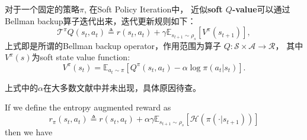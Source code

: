 对于一个固定的策略$\pi$, 在Soft Policy Iteration中，
近似{\bf soft $Q$-value}可以通过Bellman backup算子迭代出来，迭代更新规则如下：
\begin{equation}\label{soft_policy_evaluation}
\mathcal{T}^\pi Q(s_t, a_t) \triangleq r(s_t, a_t) 
+ \gamma \mathbb{E}_{s_{t+1}\sim\rho_s} [V^\pi(s_{t+1})],
\end{equation}
上式即是所谓的Bellman backup operator，作用范围为算子
$Q: \mathcal{S} \times \mathcal{A} \rightarrow \mathcal{R}$，
其中$V^\pi(s)$为soft state value function:
$$
V^\pi(s_t) = \mathbb{E}_{a_t\sim\pi}[Q^\pi(s_t,a_t)-\alpha\log\pi(a_t|s_t)].
$$
\begin{emp_box}
上式中的$\alpha$在大多数文献中并未出现，具体原因待查。
\end{emp_box}
If we define the entropy augmented reward as
$$
r_\pi(s_t,a_t) \triangleq r(s_t, a_t) 
+ \alpha\gamma \mathbb{E}_{s_{t+1}\sim\rho_s}
\left[ \mathcal{H}\left( \pi(\cdot | s_{t+1}) \right) \right]
$$
then we have
